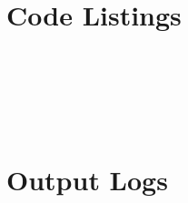 \documentclass[a4paper,titlepage]{article}
\begin{document}
	\onecolumn
	
	\begin{appendices}
		
		\section{Code Listings} \label{appendix:code}
		
		
		\begin{center}
			\inputminted{python}{../matrices.py}
			\label{lst:matrices}
		\end{center}
	
		\begin{center}
			\inputminted{python}{../q1.py}
			\label{lst:q1}
		\end{center}
	
		\begin{center}
			\inputminted{python}{../q2.py}
			\label{lst:q2}
		\end{center}
		
		
		\begin{center}
			\inputminted{python}{../q3.py}
			\label{lst:q3}
		\end{center}
	
		\begin{center}
			\inputminted{python}{../newton_raphson.py}
			\label{lst:newton_raphson}
		\end{center}

		\begin{center}
			\inputminted{python}{../q4.py}
			\label{lst:q4}
		\end{center}

		\begin{center}
			\inputminted{python}{../gauss_legendre.py}
			\label{lst:gauss_legendre}
		\end{center}	
		\section{Output Logs} \label{appendix:logs}
		

\end{appendices}
\end{document}
